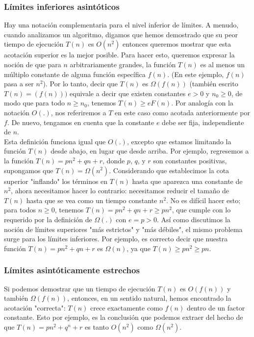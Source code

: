 \documentclass[a4paper]{article}
\begin{document}
\subsubsection*{Límites inferiores asintóticos}

Hay una notación complementaria para el nivel inferior de límites. A menudo, cuando analizamos un algoritmo, digamos que hemos demostrado que su peor tiempo de ejecución $T (n)$ es $O (n^2) $ entonces queremos mostrar que esta acotación superior es la mejor posible. Para hacer esto, queremos expresar la noción de que para  $n$ arbitrariamente grandes, la función $T(n)$ es al menos un múltiplo constante de alguna función específica $f(n)$. (En este ejemplo, $f(n)$ pasa a ser $n^2$). Por lo tanto, decir que $T(n)$ es $\Omega(f (n))$ (también escrito $ T (n) = (f (n)))$ equivale a decir que existen constantes $e > 0$ y $n_0 ≥ 0$, de modo que para todo $n ≥ n_0$, tenemos $T (n) ≥ eF(n)$. Por analogía con la notación  $O(.)$, nos referiremos a $T$ en este caso como acotada anteriormente por $f$. De nuevo, tengamos en cuenta que la constante $e$ debe ser fija, independiente de $n$. \\

Esta definición funciona igual que $O(.)$, excepto que estamos limitando la función $T(n)$ desde abajo, en lugar que desde arriba. Por ejemplo, regresemos a la función $T (n) = pn^2+ qn + r$,  donde $p$, $q$, y $r$ son constantes positivas, supongamos que $T (n)= \Omega(n^2)$. Considerando que establecimos la cota superior "inflando" los términos en $ T(n)$ hasta que aparezca una constante de $n^2$, ahora necesitamos hacer lo contrario: necesitamos reducir el tamaño de $T(n)$ hasta que se vea como un tiempo constante $n^2$. No es difícil hacer esto; para todos $n ≥ 0$, tenemos $T (n) = pn^2 + qn + r ≥ pn^2$, que cumple con lo requerido por la definición de $\Omega(.)$ con $e = p> 0$. Así como discutimos la noción de límites superiores "más estrictos" y "más débiles", el mismo problema surge para los límites inferiores. Por ejemplo, es correcto decir que nuestra función $T (n) = pn^2 + qn + r$ es $\Omega(n)$, ya que $T (n) ≥ pn^2 ≥ pn$.\\

\subsubsection*{Límites asintóticamente estrechos}

Si podemos demostrar que un tiempo de ejecución $T(n)$ es $O(f(n))$ y también $\Omega(f(n))$, entonces, en un sentido natural, hemos encontrado la acotación "correcta": $T(n)$ crece exactamente como $f(n)$ dentro de un factor constante. Esto por ejemplo, es la conclusión que podemos extraer del hecho de que $T(n) = pn^2 + q^n + r$ es tanto $O(n^2)$ como $\Omega(n^2)$. \\
\end{document}
